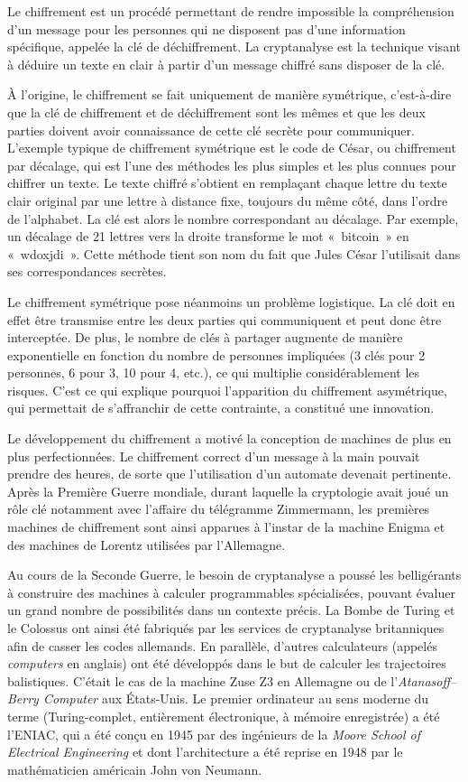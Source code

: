 \documentclass[
  a5paper,
  smalldemyvopaper,10pt,twoside,onecolumn,openright,extrafontsizes,hidelinks]{memoir}
\begin{document}
Le chiffrement est un procédé permettant de rendre impossible la
compréhension d'un message pour les personnes qui ne disposent pas d'une
information spécifique, appelée la clé de déchiffrement. La cryptanalyse
est la technique visant à déduire un texte en clair à partir d'un
message chiffré sans disposer de la clé.

À l'origine, le chiffrement se fait uniquement de manière symétrique,
c'est-à-dire que la clé de chiffrement et de déchiffrement sont les
mêmes et que les deux parties doivent avoir connaissance de cette clé
secrète pour communiquer. L'exemple typique de chiffrement symétrique
est le code de César, ou chiffrement par décalage, qui est l'une des
méthodes les plus simples et les plus connues pour chiffrer un texte. Le
texte chiffré s'obtient en remplaçant chaque lettre du texte clair
original par une lettre à distance fixe, toujours du même côté, dans
l'ordre de l'alphabet. La clé est alors le nombre correspondant au
décalage. Par exemple, un décalage de 21 lettres vers la droite
transforme le mot «~bitcoin~» en «~wdoxjdi~». Cette méthode tient son
nom du fait que Jules César l'utilisait dans ses correspondances
secrètes.

Le chiffrement symétrique pose néanmoins un problème logistique. La clé
doit en effet être transmise entre les deux parties qui communiquent et
peut donc être interceptée. De plus, le nombre de clés à partager
augmente de manière exponentielle en fonction du nombre de personnes
impliquées (3 clés pour 2 personnes, 6 pour 3, 10 pour 4, etc.), ce qui
multiplie considérablement les risques. C'est ce qui explique pourquoi
l'apparition du chiffrement asymétrique, qui permettait de s'affranchir
de cette contrainte, a constitué une innovation.

Le développement du chiffrement a motivé la conception de machines de
plus en plus perfectionnées. Le chiffrement correct d'un message à la
main pouvait prendre des heures, de sorte que l'utilisation d'un
automate devenait pertinente. Après la Première Guerre mondiale, durant
laquelle la cryptologie avait joué un rôle clé notamment avec l'affaire
du télégramme Zimmermann, les premières machines de chiffrement sont
ainsi apparues à l'instar de la machine Enigma et des machines de
Lorentz utilisées par l'Allemagne.

Au cours de la Seconde Guerre, le besoin de cryptanalyse a poussé les
belligérants à construire des machines à calculer programmables
spécialisées, pouvant évaluer un grand nombre de possibilités dans un
contexte précis. La Bombe de Turing et le Colossus ont ainsi été
fabriqués par les services de cryptanalyse britanniques afin de casser
les codes allemands. En parallèle, d'autres calculateurs (appelés
\emph{computers} en anglais) ont été développés dans le but de calculer
les trajectoires balistiques. C'était le cas de la machine Zuse Z3 en
Allemagne ou de l'\emph{Atanasoff--Berry Computer} aux États-Unis. Le
premier ordinateur au sens moderne du terme (Turing-complet, entièrement
électronique, à mémoire enregistrée) a été l'ENIAC, qui a été conçu en
1945 par des ingénieurs de la \emph{Moore School of Electrical
Engineering} et dont l'architecture a été reprise en 1948 par le
mathématicien américain John von Neumann.
\end{document}
